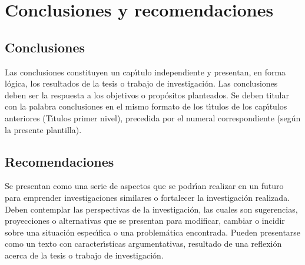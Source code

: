
\chapter{Conclusiones y recomendaciones}
\section{Conclusiones}
Las conclusiones constituyen un cap\'{\i}tulo independiente y presentan, en forma l\'{o}gica, los resultados de la tesis  o trabajo de investigaci\'{o}n. Las conclusiones deben ser la respuesta a los objetivos o prop\'{o}sitos planteados. Se deben titular con la palabra conclusiones en el mismo formato de los t\'{\i}tulos de los cap\'{\i}tulos anteriores (T\'{\i}tulos primer nivel), precedida por el numeral correspondiente (seg\'{u}n la presente plantilla).\\

\section{Recomendaciones}
Se presentan como una serie de aspectos que se podr\'{\i}an realizar en un futuro para emprender investigaciones similares o fortalecer la investigaci\'{o}n realizada. Deben contemplar las perspectivas de la investigaci\'{o}n, las cuales son sugerencias, proyecciones o alternativas que se presentan para modificar, cambiar o incidir sobre una situaci\'{o}n espec\'{\i}fica o una problem\'{a}tica encontrada. Pueden presentarse como un texto con caracter\'{\i}sticas argumentativas, resultado de una reflexi\'{o}n acerca de la tesis o trabajo de investigaci\'{o}n.\\